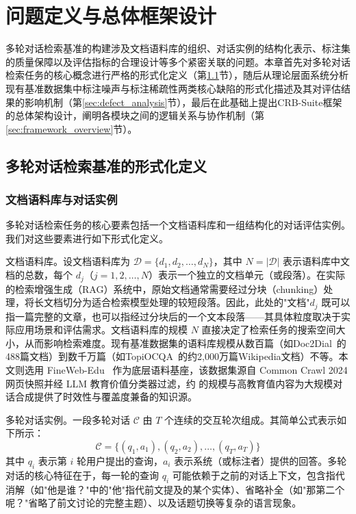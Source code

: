 \chapter{问题定义与总体框架设计}

多轮对话检索基准的构建涉及文档语料库的组织、对话实例的结构化表示、标注集的质量保障以及评估指标的合理设计等多个紧密关联的问题。本章首先对多轮对话检索任务的核心概念进行严格的形式化定义（第\ref{sec:formal_definition}节），随后从理论层面系统分析现有基准数据集中标注噪声与标注稀疏性两类核心缺陷的形式化描述及其对评估结果的影响机制（第\ref{sec:defect_analysis}节），最后在此基础上提出CRB-Suite框架的总体架构设计，阐明各模块之间的逻辑关系与协作机制（第\ref{sec:framework_overview}节）。

\section{多轮对话检索基准的形式化定义}
\label{sec:formal_definition}

\subsection{文档语料库与对话实例}

多轮对话检索任务的核心要素包括一个文档语料库和一组结构化的对话评估实例。我们对这些要素进行如下形式化定义。

文档语料库。设文档语料库为 $\mathcal{D} = \{d_1, d_2, \dots, d_N\}$，其中 $N = |\mathcal{D}|$ 表示语料库中文档的总数，每个 $d_j$（$j = 1, 2, \dots, N$）表示一个独立的文档单元（或段落）。在实际的检索增强生成（RAG）系统中，原始文档通常需要经过分块（chunking）处理，将长文档切分为适合检索模型处理的较短段落。因此，此处的"文档"$d_j$ 既可以指一篇完整的文章，也可以指经过分块后的一个文本段落——其具体粒度取决于实际应用场景和评估需求。文档语料库的规模 $N$ 直接决定了检索任务的搜索空间大小，从而影响检索难度。现有基准数据集的语料库规模从数百篇（如Doc2Dial~\citep{feng-etal-2020-doc2dial}的488篇文档）到数千万篇（如TopiOCQA~\citep{adlakha-etal-2022-topiocqa}的约2,000万篇Wikipedia文档）不等。本文则选用 FineWeb-Edu~\citep{penedo2024finewebedufineweb} 作为底层语料基座，该数据集源自 Common Crawl 2024 网页快照并经 LLM 教育价值分类器过滤，约  的规模与高教育值内容为大规模对话合成提供了时效性与覆盖度兼备的知识源。

多轮对话实例。一段多轮对话 $\mathcal{C}$ 由 $T$ 个连续的交互轮次组成。其简单公式表示如下所示：
\begin{equation}
    \mathcal{C} = \{(q_1, a_1), (q_2, a_2), \dots, (q_T, a_T)\}
\end{equation}
其中 $q_i$ 表示第 $i$ 轮用户提出的查询，$a_i$ 表示系统（或标注者）提供的回答。多轮对话的核心特征在于，每一轮的查询 $q_i$ 可能依赖于之前的对话上下文，包含指代消解（如"他是谁？"中的"他"指代前文提及的某个实体）、省略补全（如"那第二个呢？"省略了前文讨论的完整主题）、以及话题切换等复杂的语言现象。

